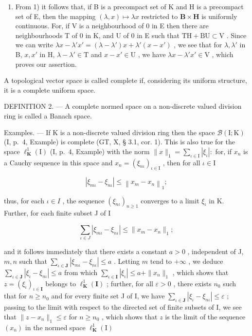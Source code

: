 \begin{enumerate}
\def\labelenumi{\arabic{enumi})}
\setcounter{enumi}{1}
\tightlist
\item
  From 1) it follows that, if B is a precompact set of K and H is a precompact set of E, then the mapping \((\lambda, x) \mapsto \lambda x\) restricted to \(\mathbf{B} \times \mathbf{H}\) is uniformly continuous. For, if V is a neighbourhood of 0 in E then there are neighbourhoods T of 0 in K, and U of 0 in E such that \(\mathrm{TH} + \mathrm{BU} \subset \mathrm{V}\) . Since we can write \(\lambda x - \lambda' x' = (\lambda - \lambda') x + \lambda'(x - x')\) , we see that for \(\lambda, \lambda'\) in B, \(x, x'\) in H, \(\lambda - \lambda' \in \mathrm{T}\) and \(x - x' \in \mathrm{U}\) , we have \(\lambda x - \lambda' x' \in \mathrm{V}\) , which proves our assertion.
\end{enumerate}

A topological vector space is called complete if, considering its uniform structure, it is a complete uniform space.

DEFINITION 2. --- A complete normed space on a non-discrete valued division ring is called a Banach space.

Examples. --- If K is a non-discrete valued division ring then the space \(\mathcal{B}(\mathrm{I};\mathrm{K})\) (I, p.~4, Example) is complete (GT, X, § 3.1, cor. 1). This is also true for the space \(\ell_{\mathbf{K}}^{1}(\mathrm{I})\) (I, p.~4, Example) with the norm \(\| x\| _1 = \sum_{\iota \in \mathrm{I}}|\xi_\iota |:\) for, if \(x_{n}\) is a Cauchy sequence in this space and \(x_{n} = (\xi_{n\iota})_{\iota \in \mathrm{I}}\) , then for all \(\iota \in \mathrm{I}\)

\[
\left| \xi_ {m\iota} - \xi_ {n\iota} \right| \leqslant \left\| x _ {m} - x _ {n} \right\| _ {1};
\]

thus, for each \(\iota \in I\) , the sequence \((\xi_{n\iota})_{n\geqslant 1}\) converges to a limit \(\xi_{\iota}\) in K. Further, for each finite subset J of I

\[
\sum_ {\iota \in J} | \xi_ {m\iota} - \xi_ {n\iota} | \leqslant \| x _ {m} - x _ {n} \| _ {1};
\]

and it follows immediately that there exists a constant \(a > 0\) , independent of J, \(m, n\) such that \(\sum_{\iota \in \mathbf{J}} |\xi_{m\iota} - \xi_{n\iota}| \leqslant a\) . Letting \(m\) tend to \(+\infty\) , we deduce \(\sum_{\iota \in \mathbf{J}} |\xi_{\iota} - \xi_{n\iota}| \leqslant a\) from which \(\sum_{\iota \in \mathbf{I}} |\xi_{\iota}| \leqslant a + \| x_n\|_1\) , which shows that \(z = (\xi_{\iota})_{\iota \in \mathbf{I}}\) belongs to \(\ell_{\mathbf{K}}^1 (\mathbf{I})\) ; further, for all \(\varepsilon > 0\) , there exists \(n_0\) such that for \(n \geqslant n_0\) and for every finite set J of I, we have \(\sum_{\iota \in \mathbf{J}} |\xi_{\iota} - \xi_{n\iota}| \leqslant \varepsilon\) ; passing to the limit with respect to the directed set of finite subsets of I, we see that \(\| z - x_n\| _1\leqslant \varepsilon\) for \(n\geqslant n_0\) , which shows that \(z\) is the limit of the sequence \((x_{n})\) in the normed space \(\ell_{\mathbf{K}}^{1}(\mathrm{I})\)

